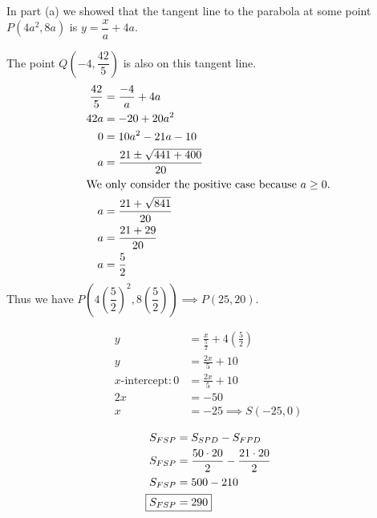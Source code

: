 \documentclass{article}
\begin{document}
\begin{itemize}
In part (a) we showed that the tangent line to the parabola at some point $P\left(4a^2,8a\right)$ is $y=\dfrac{x}{a}+4a$.
\begin{minipage}[t]{0.55\linewidth}
	The point $Q\left(-4,\dfrac{42}{5}\right)$ is also on this tangent line.
	\begin{align*}
		\frac{42}{5}&=\frac{-4}{a}+4a \\
		42a&=-20+20a^2 \\
		0&=10a^2-21a-10 \\
		a&=\frac{21\pm\sqrt{441+400}}{20} \\
		\intertext{We only consider the positive case because $a\geq0$.}
		a&=\frac{21+\sqrt{841}}{20} \\
		a&=\frac{21+29}{20} \\
		a&=\frac{5}{2}
	\end{align*}
	Thus we have $P\left(4\left(\dfrac{5}{2}\right)^2,8\left(\dfrac{5}{2}\right)\right)\implies P(25,20)$.
\end{minipage}
\begin{minipage}[t]{0.44\linewidth}
	\begin{align*}
		y&=\frac{x}{\frac{5}{2}}+4\left(\frac{5}{2}\right) \\
		y&=\frac{2x}{5}+10 \\
		\text{$x$-intercept}:0&=\frac{2x}{5}+10 \\
		2x&=-50 \\
		x&=-25 \implies S(-25,0)
	\end{align*}
\end{minipage}

\centering
\begin{minipage}{0.28\linewidth}
\begin{align*}
	S_{FSP}&=S_{SPD}-S_{FPD} \\
	S_{FSP}&=\frac{50\cdot20}{2}-\frac{21\cdot20}{2} \\
	S_{FSP}&=500-210 \\
	\Aboxed{S_{FSP}&=290} \\
\end{align*}
\end{minipage}
\begin{minipage}{0.7\linewidth}
	\vspace*{-50pt}
\end{minipage}
\end{itemize}
\end{document}
